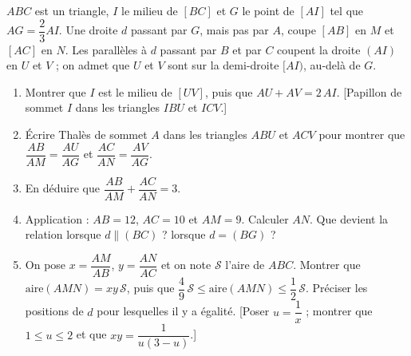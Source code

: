 
$ABC$ est un triangle, $I$ le milieu de $[BC]$ et $G$ le point de $[AI]$ tel que $AG=\dfrac23AI$. Une droite $d$ passant par $G$, mais pas par $A$, coupe $[AB]$ en $M$ et $[AC]$ en $N$. Les parallèles à $d$ passant par $B$ et par $C$ coupent la droite $(AI)$ en $U$ et $V$ ; on admet que $U$ et $V$ sont sur la demi-droite $[AI)$, au-delà de $G$.
\begin{center}
\end{center}
\begin{enumerate}
  \item Montrer que $I$ est le milieu de $[UV]$, puis que $AU+AV=2\,AI$. [Papillon de sommet $I$ dans les triangles $IBU$ et $ICV$.]
  \item Écrire Thalès de sommet $A$ dans les triangles $ABU$ et $ACV$ pour montrer que $\dfrac{AB}{AM}=\dfrac{AU}{AG}$ et $\dfrac{AC}{AN}=\dfrac{AV}{AG}$.
  \item En déduire que $\dfrac{AB}{AM}+\dfrac{AC}{AN}=3$.
  \item Application : $AB=12$, $AC=10$ et $AM=9$. Calculer $AN$. Que devient la relation lorsque $d\parallel(BC)$ ? lorsque $d=(BG)$ ?
  \item On pose $x=\dfrac{AM}{AB}$, $y=\dfrac{AN}{AC}$ et on note $\mathcal S$ l'aire de $ABC$. Montrer que $\text{aire}(AMN)=xy\,\mathcal S$, puis que $\dfrac49\,\mathcal S\leq\text{aire}(AMN)\leq\dfrac12\,\mathcal S$. Préciser les positions de $d$ pour lesquelles il y a égalité. [Poser $u=\dfrac1x$ ; montrer que $1\leq u\leq2$ et que $xy=\dfrac1{u(3-u)}$.]
\end{enumerate}

